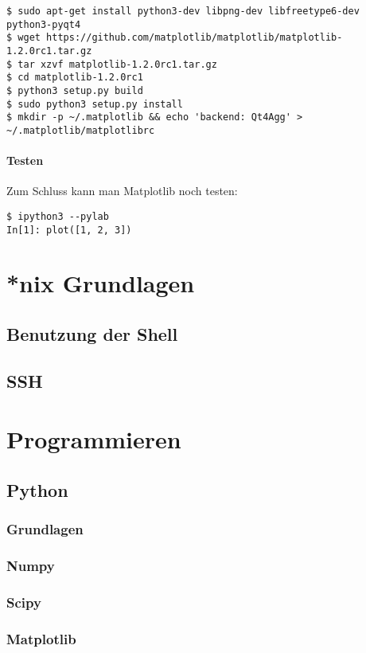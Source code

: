 \begin{verbatim}
$ sudo apt-get install python3-dev libpng-dev libfreetype6-dev python3-pyqt4
$ wget https://github.com/matplotlib/matplotlib/matplotlib-1.2.0rc1.tar.gz
$ tar xzvf matplotlib-1.2.0rc1.tar.gz
$ cd matplotlib-1.2.0rc1
$ python3 setup.py build
$ sudo python3 setup.py install
$ mkdir -p ~/.matplotlib && echo 'backend: Qt4Agg' > ~/.matplotlib/matplotlibrc
\end{verbatim}

\subsubsection{Testen}

Zum Schluss kann man Matplotlib noch testen:

\begin{verbatim}
$ ipython3 --pylab
In[1]: plot([1, 2, 3])
\end{verbatim}

\chapter{*nix Grundlagen}
\section{Benutzung der Shell}
\section{SSH}


\chapter{Programmieren}
\section{Python}
\subsection{Grundlagen}
\subsection{Numpy}
\subsection{Scipy}
\subsection{Matplotlib}
